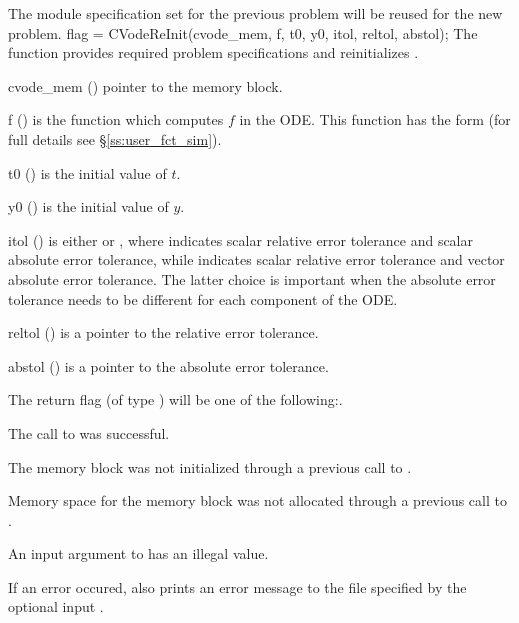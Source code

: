The {\nvector} module specification  set for the previous problem
will be reused for the new problem.
{
  flag = CVodeReInit(cvode\_mem, f, t0, y0, itol, reltol, abstol);
}
{
  The function  provides required problem specifications 
  and reinitializes {\cvodes}.
}
{
  \begin{args}[abstol]
  \item[cvode\_mem] ()
    pointer to the {\cvodes} memory block.
  \item[f] ()
    is the {\C} function which computes $f$ in the ODE. This function has the form 
     (for full details see \S\ref{ss:user_fct_sim}).
  \item[t0] ()
    is the initial value of $t$.
  \item[y0] ()
    is the initial value of $y$. 
  \item[itol] () 
    is either  or , where  indicates scalar relative error 
    tolerance and scalar absolute error tolerance, while  indicates scalar
    relative error tolerance and vector absolute error tolerance. 
    The latter choice is important when the absolute error tolerance needs to
    be different for each component of the ODE. 
  \item[reltol] ()
    is a pointer to the relative error tolerance.
  \item[abstol] ()
    is a pointer to the absolute error tolerance.
  \end{args}
}
{
  The return flag  (of type ) will be one of the following:.
  \begin{args}
  \item[\Id{SUCCESS}]
    The call to  was successful.
  \item[\Id{CVREI\_NO\_MEM}] 
    The {\cvodes} memory block was not initialized through a 
    previous call to .
  \item[\Id{CVREI\_NO\_MALLOC}] 
    Memory space for the {\cvodes} memory block was not allocated through a 
    previous call to .
  \item[\Id{CVREI\_ILL\_INPUT}] 
    An input argument to  has an illegal value.
  \end{args}
}
{
  If an error occured,  also prints an error message to the
  file specified by the optional input .
}
